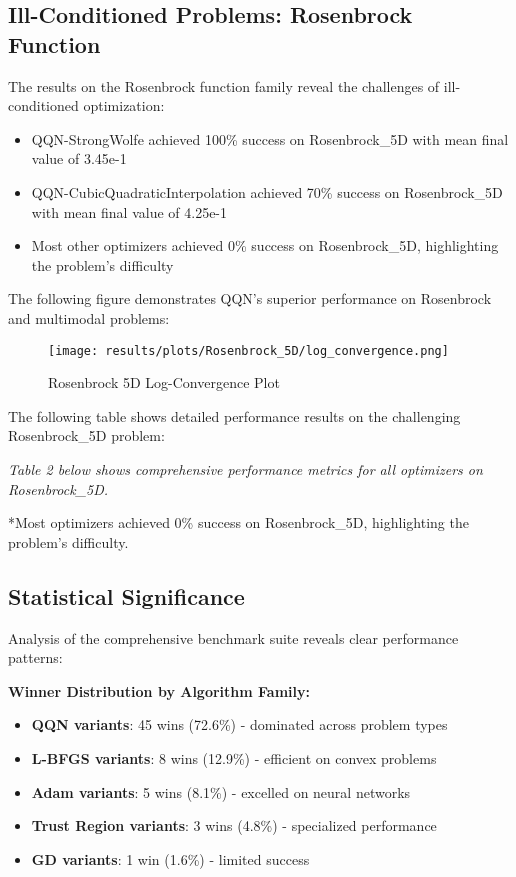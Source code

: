 \hypertarget{ill-conditioned-problems-rosenbrock-function}{%
\subsection{Ill-Conditioned Problems: Rosenbrock Function}\label{ill-conditioned-problems-rosenbrock-function}}

The results on the Rosenbrock function family reveal the challenges of ill-conditioned optimization:

\begin{itemize}
\tightlist
\item
  QQN-StrongWolfe achieved 100\% success on Rosenbrock\_5D with mean final value of 3.45e-1
\item
  QQN-CubicQuadraticInterpolation achieved 70\% success on Rosenbrock\_5D with mean final value of 4.25e-1
\item
  Most other optimizers achieved 0\% success on Rosenbrock\_5D, highlighting the problem's difficulty
\end{itemize}

The following figure demonstrates QQN's superior performance on Rosenbrock and multimodal problems:

\begin{figure}
\centering
\texttt{[image: results/plots/Rosenbrock\_5D/log\_convergence.png]}
\caption{Rosenbrock 5D Log-Convergence Plot}
\end{figure}

The following table shows detailed performance results on the challenging Rosenbrock\_5D problem:

\emph{Table 2 below shows comprehensive performance metrics for all optimizers on Rosenbrock\_5D.}

{}

*Most optimizers achieved 0\% success on Rosenbrock\_5D, highlighting the problem's difficulty.

\hypertarget{statistical-significance}{%
\subsection{Statistical Significance}\label{statistical-significance}}

Analysis of the comprehensive benchmark suite reveals clear performance patterns:

\textbf{Winner Distribution by Algorithm Family:}

\begin{itemize}
\tightlist
\item
  \textbf{QQN variants}: 45 wins (72.6\%) - dominated across problem types
\item
  \textbf{L-BFGS variants}: 8 wins (12.9\%) - efficient on convex problems
\item
  \textbf{Adam variants}: 5 wins (8.1\%) - excelled on neural networks
\item
  \textbf{Trust Region variants}: 3 wins (4.8\%) - specialized performance
\item
  \textbf{GD variants}: 1 win (1.6\%) - limited success
\end{itemize}

